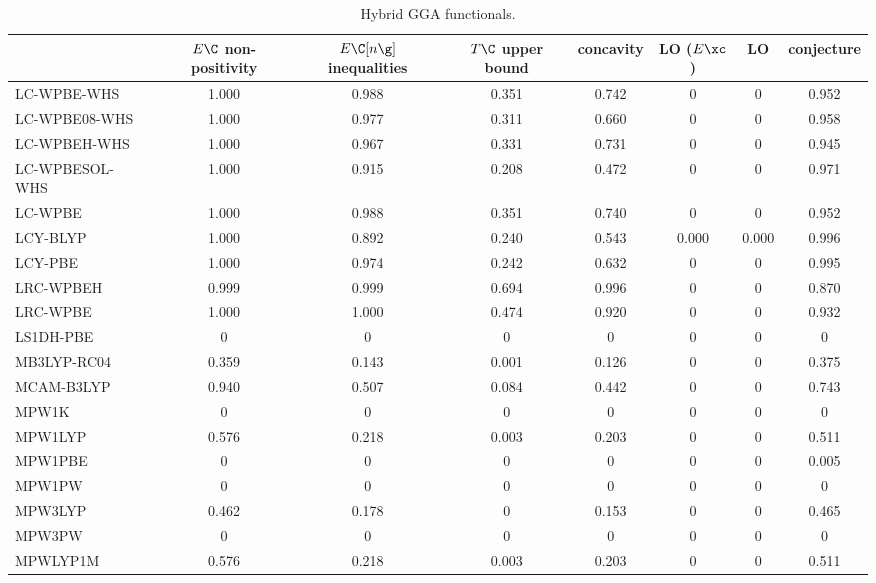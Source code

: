 \begin{table}
\caption{Hybrid GGA functionals.}
\begin{tabular}{|l|c|c|c|c|c|c|c|}
\toprule
 & $E\C$ non-positivity & $E\C[n\g]$ inequalities & $T\C$ upper bound & concavity & LO ($E\xc$) & LO & conjecture \\
\midrule
LC-WPBE-WHS~\cite{Weintraub2009_754,Henderson2008_194105} & 1.000 & 0.988 & 0.351 & 0.742 & 0 & 0 & 0.952 \\
LC-WPBE08-WHS~\cite{Weintraub2009_754,Henderson2008_194105} & 1.000 & 0.977 & 0.311 & 0.660 & 0 & 0 & 0.958 \\
LC-WPBEH-WHS~\cite{Weintraub2009_754,Henderson2008_194105} & 1.000 & 0.967 & 0.331 & 0.731 & 0 & 0 & 0.945 \\
LC-WPBESOL-WHS~\cite{Weintraub2009_754,Henderson2008_194105} & 1.000 & 0.915 & 0.208 & 0.472 & 0 & 0 & 0.971 \\
LC-WPBE~\cite{Vydrov2006_234109} & 1.000 & 0.988 & 0.351 & 0.740 & 0 & 0 & 0.952 \\
LCY-BLYP~\cite{Akinaga2008_348,Seth2013_2286} & 1.000 & 0.892 & 0.240 & 0.543 & 0.000 & 0.000 & 0.996 \\
LCY-PBE~\cite{Seth2012_901,Seth2013_2286} & 1.000 & 0.974 & 0.242 & 0.632 & 0 & 0 & 0.995 \\
LRC-WPBEH~\cite{Rohrdanz2009_054112} & 0.999 & 0.999 & 0.694 & 0.996 & 0 & 0 & 0.870 \\
LRC-WPBE~\cite{Rohrdanz2009_054112} & 1.000 & 1.000 & 0.474 & 0.920 & 0 & 0 & 0.932 \\
LS1DH-PBE~\cite{Toulouse2011_101102} & 0 & 0 & 0 & 0 & 0 & 0 & 0 \\
MB3LYP-RC04~\cite{Tognetti2007_381} & 0.359 & 0.143 & 0.001 & 0.126 & 0 & 0 & 0.375 \\
MCAM-B3LYP~\cite{Day2006_094103} & 0.940 & 0.507 & 0.084 & 0.442 & 0 & 0 & 0.743 \\
MPW1K~\cite{Lynch2000_4811} & 0 & 0 & 0 & 0 & 0 & 0 & 0 \\
MPW1LYP~\cite{Adamo1998_664} & 0.576 & 0.218 & 0.003 & 0.203 & 0 & 0 & 0.511 \\
MPW1PBE~\cite{Adamo1998_664} & 0 & 0 & 0 & 0 & 0 & 0 & 0.005 \\
MPW1PW~\cite{Adamo1998_664} & 0 & 0 & 0 & 0 & 0 & 0 & 0 \\
MPW3LYP~\cite{Zhao2004_6908} & 0.462 & 0.178 & 0 & 0.153 & 0 & 0 & 0.465 \\
MPW3PW~\cite{Adamo1998_664} & 0 & 0 & 0 & 0 & 0 & 0 & 0 \\
MPWLYP1M~\cite{Schultz2005_11127} & 0.576 & 0.218 & 0.003 & 0.203 & 0 & 0 & 0.511 \\

\end{tabular}
\end{table}
